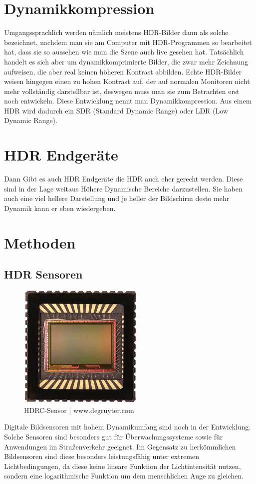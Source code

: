 \documentclass[conference]{IEEEtran}
\begin{document}
\section{Dynamikkompression}
Umgangssprachlich werden nämlich meistens HDR-Bilder dann als solche bezeichnet, nachdem man sie am Computer mit HDR-Programmen so bearbeitet hat, dass sie so aussehen wie man die Szene auch live gesehen hat. Tatsächlich handelt es sich aber um dynamikkomprimierte Bilder, die zwar mehr Zeichnung aufweisen, die aber real keinen höheren Kontrast abbilden. Echte HDR-Bilder weisen hingegen einen zu hohen Kontrast auf, der auf normalen Monitoren nicht mehr vollständig darstellbar ist, deswegen muss man sie zum Betrachten erst noch entwickeln. Diese Entwicklung nennt man Dynamikkompression. Aus einem HDR wird dadurch ein SDR (Standard Dynamic Range) oder LDR (Low Dynamic Range). 
\section{HDR Endgeräte}
Dann Gibt es auch HDR Endgeräte die HDR auch eher gerecht werden. Diese sind in der Lage weitaus Höhere Dynamische Bereiche darzustellen. Sie haben auch eine viel hellere Darstellung und je heller der Bildschirm desto mehr Dynamik kann er eben wiedergeben.
\section{Methoden}
\subsection{HDR Sensoren}
\begin{figure}[H]
	\centering
	\includegraphics[scale=0.5]{img/hdrcsensor.jpg}
	\caption{HDRC-Sensor | www.degruyter.com}
	\label{fig}
\end{figure}
Digitale Bildsensoren mit hohem Dynamikumfang sind noch in der Entwicklung. Solche Sensoren sind besonders gut für Überwachungssysteme sowie für Anwendungen im Straßenverkehr geeignet. Im Gegensatz zu herkömmlichen Bildsensoren sind diese besonders leistungsfähig unter extremen Lichtbedingungen, da diese keine lineare Funktion der Lichtintensität nutzen, sondern eine logarithmische Funktion um dem menschlichen Auge zu gleichen.
\end{document}

